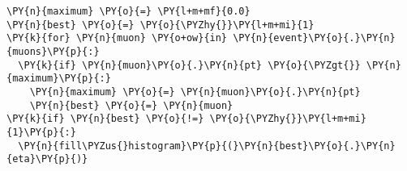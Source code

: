\begin{Verbatim}[commandchars=\\\{\}]
\PY{n}{maximum} \PY{o}{=} \PY{l+m+mf}{0.0}
\PY{n}{best} \PY{o}{=} \PY{o}{\PYZhy{}}\PY{l+m+mi}{1}
\PY{k}{for} \PY{n}{muon} \PY{o+ow}{in} \PY{n}{event}\PY{o}{.}\PY{n}{muons}\PY{p}{:}
  \PY{k}{if} \PY{n}{muon}\PY{o}{.}\PY{n}{pt} \PY{o}{\PYZgt{}} \PY{n}{maximum}\PY{p}{:}
    \PY{n}{maximum} \PY{o}{=} \PY{n}{muon}\PY{o}{.}\PY{n}{pt}
    \PY{n}{best} \PY{o}{=} \PY{n}{muon}
\PY{k}{if} \PY{n}{best} \PY{o}{!=} \PY{o}{\PYZhy{}}\PY{l+m+mi}{1}\PY{p}{:}
  \PY{n}{fill\PYZus{}histogram}\PY{p}{(}\PY{n}{best}\PY{o}{.}\PY{n}{eta}\PY{p}{)}
\end{Verbatim}
